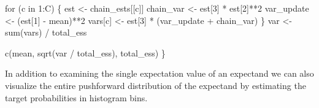 \documentclass[
  letterpaper,
  DIV=11,
  numbers=noendperiod]{scrartcl}
\newenvironment{Shaded}{\begin{snugshade}}{\end{snugshade}}
\newcommand{\BuiltInTok}[1]{\textcolor[rgb]{0.00,0.23,0.31}{#1}}
\newcommand{\ControlFlowTok}[1]{\textcolor[rgb]{0.00,0.23,0.31}{#1}}
\newcommand{\DecValTok}[1]{\textcolor[rgb]{0.68,0.00,0.00}{#1}}
\newcommand{\KeywordTok}[1]{\textcolor[rgb]{0.00,0.23,0.31}{#1}}
\newcommand{\NormalTok}[1]{\textcolor[rgb]{0.00,0.23,0.31}{#1}}
\newcommand{\OperatorTok}[1]{\textcolor[rgb]{0.37,0.37,0.37}{#1}}
\begin{document}
\begin{Shaded}
\begin{Highlighting}[]
  \ControlFlowTok{for}\NormalTok{ (c }\KeywordTok{in} \DecValTok{1}\NormalTok{:C) \{}
\NormalTok{    est }\OperatorTok{\textless{}{-}}\NormalTok{ chain\_ests[[c]]}
\NormalTok{    chain\_var }\OperatorTok{\textless{}{-}}\NormalTok{ est[}\DecValTok{3}\NormalTok{] }\OperatorTok{*}\NormalTok{ est[}\DecValTok{2}\NormalTok{]}\OperatorTok{**}\DecValTok{2}
\NormalTok{    var\_update }\OperatorTok{\textless{}{-}}\NormalTok{ (est[}\DecValTok{1}\NormalTok{] }\OperatorTok{{-}}\NormalTok{ mean)}\OperatorTok{**}\DecValTok{2}
    \BuiltInTok{vars}\NormalTok{[c] }\OperatorTok{\textless{}{-}}\NormalTok{ est[}\DecValTok{3}\NormalTok{] }\OperatorTok{*}\NormalTok{ (var\_update }\OperatorTok{+}\NormalTok{ chain\_var)}
\NormalTok{  \}}
\NormalTok{  var }\OperatorTok{\textless{}{-}} \BuiltInTok{sum}\NormalTok{(}\BuiltInTok{vars}\NormalTok{) }\OperatorTok{/}\NormalTok{ total\_ess}
  
\NormalTok{  c(mean, sqrt(var }\OperatorTok{/}\NormalTok{ total\_ess), total\_ess)}
\NormalTok{\}}
\end{Highlighting}
\end{Shaded}

In addition to examining the single expectation value of an expectand we
can also visualize the entire pushforward distribution of the expectand
by estimating the target probabilities in histogram bins.
\end{document}
